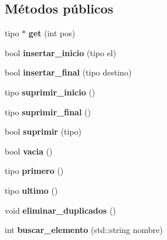\subsection*{Métodos públicos}
\begin{DoxyCompactItemize}
\item 
\mbox{\label{classLista_ada89d0bebdb2db83b7c19c940ab70e62}} 
tipo $\ast$ {\bfseries get} (int pos)
\item 
\mbox{\label{classLista_a4b6c7156fcd7ca69d5b12bcbb3312590}} 
bool {\bfseries insertar\+\_\+inicio} (tipo el)
\item 
\mbox{\label{classLista_a4ff75a84824729ce5af9d9f5d184020a}} 
bool {\bfseries insertar\+\_\+final} (tipo destino)
\item 
\mbox{\label{classLista_aa945bc96acdaeaefb3b9180f05539142}} 
tipo {\bfseries suprimir\+\_\+inicio} ()
\item 
\mbox{\label{classLista_aa23f3bd8ec8de6a913cc9cd876ef82b6}} 
tipo {\bfseries suprimir\+\_\+final} ()
\item 
\mbox{\label{classLista_a846073e6ce175fa96c6322a4870ddc6d}} 
bool {\bfseries suprimir} (tipo)
\item 
\mbox{\label{classLista_a92650be08dd29c9800da07c65ad6ff3a}} 
bool {\bfseries vacia} ()
\item 
\mbox{\label{classLista_a7bfb23a36d8476b8731d955bd52b81d5}} 
tipo {\bfseries primero} ()
\item 
\mbox{\label{classLista_ab425ba6e39a83df96a56ef6d58bce951}} 
tipo {\bfseries ultimo} ()
\item 
\mbox{\label{classLista_a984961f2492bbd50fc373c2726a26e82}} 
void {\bfseries eliminar\+\_\+duplicados} ()
\item 
\mbox{\label{classLista_a18cad7f9b4ae2e76a3083e8e25246588}} 
int {\bfseries buscar\+\_\+elemento} (std\+::string nombre)
\item 
\mbox{\label{classLista_ac1b4a38c8aee5835dcbb3185972c1b11}} 

\end{DoxyCompactItemize}
